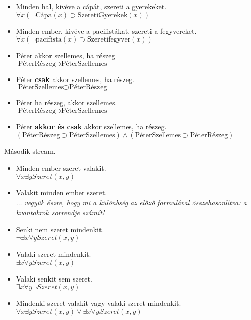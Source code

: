 \documentclass{article}
\begin{document}
\begin{itemize}
\item
 Minden hal, kivéve a cápát, szereti a gyerekeket. \\
$\forall x ( \neg \text{Cápa}(x) \supset \text{SzeretiGyerekek}(x))$

\item
 Minden ember, kivéve a pacifistákat, szereti a fegyvereket. \\
$\forall x ( \neg \text{pacifista}(x) \supset \text{Szeretifegyver}(x))$

\item
Péter akkor szellemes, ha részeg\\
$ \text{PéterRészeg} \supset  \text{PéterSzellemes}$

\item
Péter \textbf{csak} akkor szellemes, ha részeg.\\
$ \text{PéterSzellemes} \supset  \text{PéterRészeg}$

\item
Péter ha részeg, akkor szellemes.\\
$ \text{PéterRészeg} \supset  \text{PéterSzellemes}$


\item
Péter \textbf{akkor és csak} akkor szellemes, ha részeg.\\
$( \text{PéterRészeg} \supset  \text{PéterSzellemes})\wedge( \text{PéterSzellemes} \supset  \text{PéterRészeg})$

 \end{itemize}

Második stream.

\begin{itemize}
\item
 Minden ember szeret valakit. \\
$\forall x \exists y Szeret(x, y)$

\item
Valakit minden ember szeret. \\
$\dots$ \textit{vegyük észre, hogy mi a különbség az előző formulával összehasonlítva: a kvantokrok sorrendje számít!}

\item
Senki nem szeret mindenkit. \\
$\neg \exists x \forall y  Szeret(x, y)$

\item
Valaki szeret mindenkit. \\
$\exists x \forall y  Szeret(x, y)$


\item
Valaki senkit sem szeret. \\
$\exists x  \forall y  \neg  Szeret (x, y)$

\item
Mindenki szeret valakit vagy valaki szeret mindenkit. \\
$ \forall x \exists y Szeret(x, y) \vee \exists x \forall y  Szeret(x, y)$

 \end{itemize}
 
\end{document}
